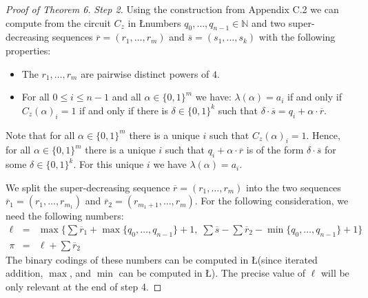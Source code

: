 \begin{proof}[Proof of Theorem 6]
\medskip
\noindent
{\em Step 2.}
Using the construction from Appendix C.2 we can compute from the  
circuit $C_z$ in \L numbers $q_{0}, \ldots, q_{n-1} \in \mathbb{N}$ and two super-decreasing sequences 
$\overline{r} = (r_1, \ldots, r_m)$ and $\overline{s} =(s_1, \ldots, s_k)$ with the following properties:
\begin{itemize}
\item The $r_1, \ldots, r_m$ are pairwise distinct powers of $4$. 
\item For all $0 \leq i \leq n-1$ and all $\alpha \in \{0,1\}^m$ we have:
$\lambda(\alpha) = a_i$ if and only if
$C_z(\alpha)_i = 1$  if and only if there is $\delta \in \{0,1\}^k$ such that $\delta \cdot \overline{s} = q_{i} + \alpha \cdot \overline{r}$. 
\end{itemize}
Note that for all $\alpha \in \{0,1\}^m$ there is a unique $i$ such that $C_z(\alpha)_i = 1$.
Hence, for all  $\alpha \in \{0,1\}^m$ there is a unique $i$ such that $q_{i} + \alpha \cdot \overline{r}$ is of the form 
$\delta \cdot \overline{s}$ for some $\delta \in \{0,1\}^k$. For this unique $i$ we have $\lambda(\alpha) = a_i$.

We split the super-decreasing sequence $\overline{r} = (r_1, \ldots, r_m)$ into the two
sequences $\overline{r}_1 = (r_1, \ldots, r_{m_1})$ and $\overline{r}_2 = (r_{m_1+1}, \ldots, r_m)$.
For the following consideration, we need the following numbers:
\begin{eqnarray}
\ell & = & \textstyle \max\big\{ \sum \overline{r}_1 + \max\{q_0, \ldots, q_{n-1}\}+1, \; \sum\overline{s} - \sum\overline{r}_2 - \min \{q_0, \ldots, q_{n-1}\}+1\big\} \label{eq:l} \\
\pi &= & \textstyle \ell + \sum \overline{r}_2 
\end{eqnarray}
The binary codings of these numbers can be computed in \L (since iterated addition, $\max$, and $\min$ can be computed in \L).
The precise value of $\ell$ will be only relevant at the end of step 4.


\end{proof}
